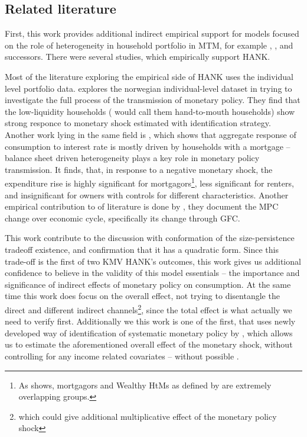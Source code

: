 \documentclass[12pt]{article}
\numberwithin{equation}{section}
\begin{document}
\subsection{Related literature}


First, this work provides additional indirect empirical support for models focused on the role of heterogeneity in household portfolio in MTM, for example \citet{KMV2018}, \citet{Auclert2019}, \citet{Luetticke2021} and successors.
There were several studies, which empirically support HANK. 

Most of the literature exploring the empirical side of HANK uses the individual level portfolio data. \citet{HolmPaulTischbirek2020} explores the norwegian individual-level dataset in trying to investigate the full process of the transmission of monetary policy.
They find that the low-liquidity households (\citeauthor{KMV2018} would call them hand-to-mouth households) show strong responce to monetary shock estimated with \cite{RomerRomer2004} identification strategy.
Another work lying in the same field is \citet{Cloyne2019}, which  shows that aggregate response of consumption to interest rate is mostly driven by households with a mortgage -- balance sheet driven heterogeneity plays a key role in monetary policy transmission.
It finds, that, in response to a negative monetary shock, the expenditure rise is highly significant for mortgagors\footnote{As \citet{Cloyne2019} shows, mortgagors and Wealthy HtMs as defined by \citet{KVW2014} are extremely overlapping groups.}, less significant for renters, and insignificant for owners with controls for different characteristics.
Another empirical contribution to of literature is done by \citet{Gross2020}, they document the MPC change over economic cycle, specifically its change through GFC.



This work contribute to the discussion with conformation of the size-persistence tradeoff existence, and confirmation that it has a quadratic form.
Since this trade-off is the first of two KMV HANK's outcomes, this work gives us additional confidence to believe in the validity of this model essentials -- the importance and significance of indirect effects of monetary policy on consumption.
At the same time this work does focus on the overall effect, not trying to disentangle the direct and different indirect channels\footnote{which could give additional multiplicative effect of the monetary policy shock}, since the total effect is what actually we need to verify first.
Additionally we this work is one of the first, that uses newly developed way of identification of systematic monetary policy  by , which allows us to estimate the aforementioned overall effect of the monetary shock, without controlling for any income related covariates -- without possible .
\end{document}
